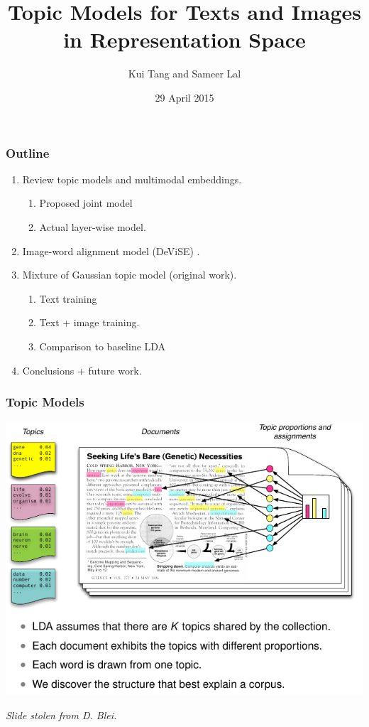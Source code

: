 \documentclass{beamer}
\title{Topic Models for Texts and Images in Representation Space}
\author{Kui Tang and Sameer Lal}
\institute{Columbia University}
\date{29 April 2015}
\begin{document}
\frame{\titlepage}

\begin{frame}
  \frametitle{Outline}
  \begin{enumerate}
    \item Review topic models and multimodal embeddings.
      \begin{enumerate}
        \item Proposed joint model
        \item Actual layer-wise model.
      \end{enumerate}
    \item Image-word alignment model (DeViSE) \citep{Frome13}.
    \item Mixture of Gaussian topic model (original work).
    \begin{enumerate}
      \item Text training
      \item Text + image training. 
      \item Comparison to baseline LDA
    \end{enumerate}
    \item Conclusions + future work.
  \end{enumerate}
\end{frame}


\begin{frame}
  \frametitle{Topic Models}
  {\centering \includegraphics[width=\textwidth]{assets/lda_colors.pdf}}
  {\small \emph{Slide stolen from D. Blei.} \par}
\end{frame}
\end{document}
